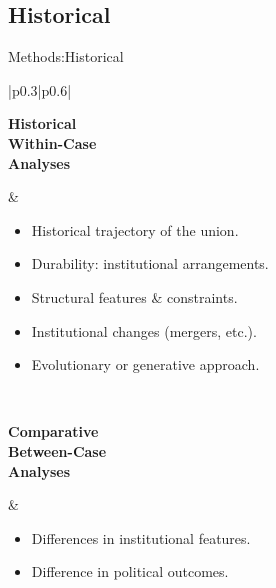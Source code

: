 \documentclass{beamer}
\begin{document}
\subsection{Historical}
\begin{frame}{Methods:Historical}
\setlength{\arrayrulewidth}{0.0pt} %
\begin{tabular}{|p{0.3\textwidth}|p{0.6\textwidth}|}
\hline
\begin{minipage}[t][0.2\textheight][t]{\linewidth}
\textbf{Historical\\
Within-Case\\
Analyses}
\end{minipage}
&
\begin{itemize}
    \item Historical trajectory of the union.
    \item Durability: institutional arrangements.
    \item Structural features \& constraints.
    \item Institutional changes (mergers, etc.).
    \item Evolutionary or generative approach. %
\end{itemize}
\\
\hline
\begin{minipage}[c][0.2\textheight][b]{\linewidth}
\textbf{Comparative\\
Between-Case\\
Analyses}
\end{minipage}
&
\begin{itemize}
    \item Differences in institutional features.
    \item Difference in political outcomes.
\end{itemize}
\\
\hline
\end{tabular}
\end{frame}

\end{document}
